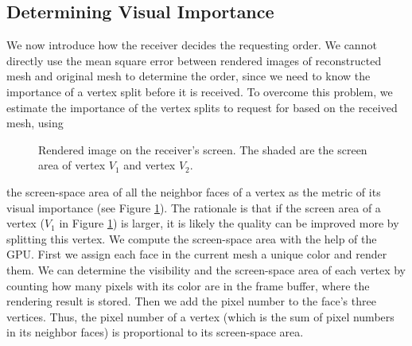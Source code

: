      \subsection{Determining Visual Importance}
     \label{ss:dstream:visual}
     We now introduce how the receiver decides the requesting order. 
     We cannot directly use the mean square error between rendered images of 
     reconstructed mesh and original mesh to determine the order, 
     since we need to know the importance of a vertex 
     split before it is received. To overcome this problem, we estimate
     the importance of the vertex splits to request for based on the received
     mesh, using
    \begin{figure}
    \centering
    \caption{%
    Rendered image on the receiver's screen. 
    The shaded are the screen area of vertex $V_1$ and vertex $V_2$.
    \label{dstream:screen_area}}
    \end{figure}
     the screen-space area of all the neighbor faces of a vertex as the 
     metric of its visual importance (see Figure \ref{dstream:screen_area}).
     The rationale is that if the screen area of a vertex ($V_1$ in Figure \ref{dstream:screen_area}) 
    is larger, it is likely the quality can
    be improved more by splitting this vertex. 
    We compute the screen-space area with the help of the GPU. 
    First we assign each face in
    the current mesh a unique color and render them. 
    We can determine the visibility
    and the screen-space area of each vertex by counting how many pixels with its color
    are in the frame buffer, where the rendering result is stored. 
    Then we add the pixel number to the face's three vertices. Thus, the
    pixel number of a vertex (which is the sum of pixel numbers in its neighbor faces)
    is proportional
    to its screen-space area.
    
